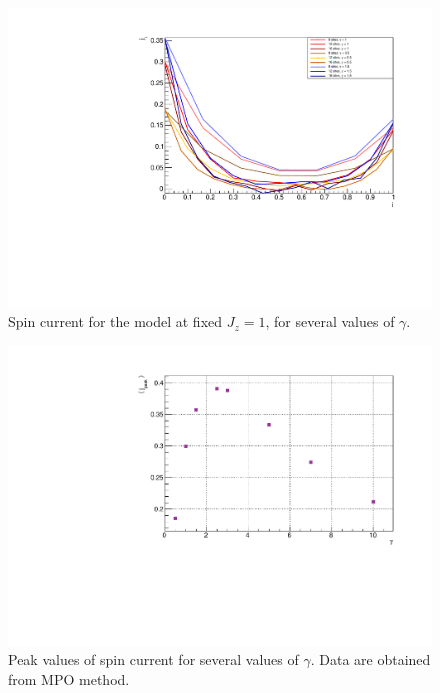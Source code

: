 \begin{figure}[H]
    \centering
    \includegraphics[scale=0.7]{Figures/SpinCurrcomparisonVSsizeANDdissipationRate.pdf}
    \caption{Spin current for the model at fixed $J_z = 1$, for several values of $\gamma$.}
    \label{fig:SpinCurrcomparisonVSsizeANDdissipationRate}
\end{figure}

\begin{figure}[H]
    \centering
    \includegraphics[scale=0.7]{Figures/PeakValueSpinCurrVSgamma_8sites.pdf}
    \caption{Peak values of spin current for several values of $\gamma$. Data are obtained from MPO method.}
    \label{fig:PeakValueSpinCurrVSgamma_8sites}
\end{figure}

